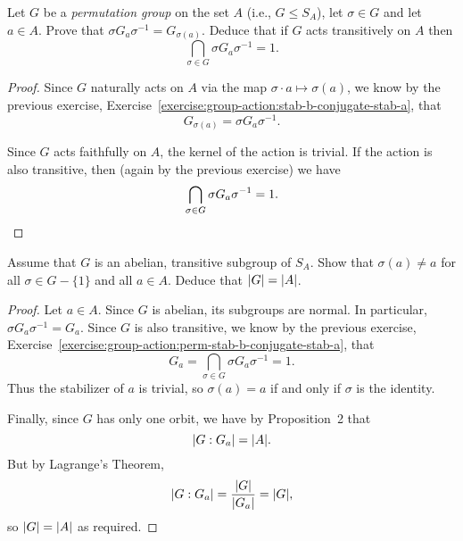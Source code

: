 \label{exercise:group-action:perm-stab-b-conjugate-stab-a}
Let $G$ be a {\em permutation group} on the set $A$ (i.e.,
$G\leq S_A$), let $\sigma\in G$ and let $a\in A$. Prove that
$\sigma G_a\sigma^{-1} = G_{\sigma(a)}$. Deduce that if $G$ acts
transitively on $A$ then
\begin{equation*}
  \bigcap_{\sigma\in G}\sigma G_a\sigma^{-1} = 1.
\end{equation*}
\begin{proof}
  Since $G$ naturally acts on $A$ via the map
  $\sigma\cdot a\mapsto\sigma(a)$, we know by the previous exercise,
  Exercise~\ref{exercise:group-action:stab-b-conjugate-stab-a}, that
  \begin{equation*}
    G_{\sigma(a)} = \sigma G_a\sigma^{-1}.
  \end{equation*}

  Since $G$ acts faithfully on $A$, the kernel of the action is
  trivial. If the action is also transitive, then (again by the
  previous exercise) we have
  \begin{equation*}
    \bigcap_{\sigma\in G}\sigma G_a\sigma^{-1} = 1. \qedhere
  \end{equation*}
\end{proof}

 Assume that $G$ is an abelian, transitive subgroup of
$S_A$. Show that $\sigma(a) \neq a$ for all $\sigma\in G - \{1\}$ and
all $a\in A$. Deduce that $\lvert{G}\rvert = \lvert{A}\rvert$.
\begin{proof}
  Let $a\in A$. Since $G$ is abelian, its subgroups are normal. In
  particular, $\sigma G_a\sigma^{-1} = G_a$. Since $G$ is also
  transitive, we know by the previous exercise,
  Exercise~\ref{exercise:group-action:perm-stab-b-conjugate-stab-a},
  that
  \begin{equation*}
    G_a = \bigcap_{\sigma\in G}\sigma G_a\sigma^{-1} = 1.
  \end{equation*}
  Thus the stabilizer of $a$ is trivial, so $\sigma(a) = a$ if and
  only if $\sigma$ is the identity.

  Finally, since $G$ has only one orbit, we have by Proposition~2 that
  \begin{equation*}
    \lvert{G : G_a}\rvert = \lvert{A}\rvert.
  \end{equation*}
  But by Lagrange's Theorem,
  \begin{equation*}
    \lvert{G : G_a}\rvert = \frac{\lvert{G}\rvert}{\lvert{G_a}\rvert} = \lvert{G}\rvert,
  \end{equation*}
  so $\lvert{G}\rvert = \lvert{A}\rvert$ as required.
\end{proof}
